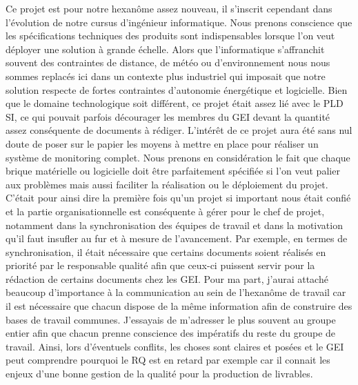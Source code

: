 Ce projet est pour notre hexanôme assez nouveau, il s'inscrit cependant dans l'évolution de notre cursus d'ingénieur informatique. Nous prenons conscience que les spécifications techniques des produits sont indispensables lorsque l'on veut déployer une solution à grande échelle. Alors que l'informatique s'affranchit souvent des contraintes de distance, de météo ou d'environnement nous nous sommes replacés ici dans un contexte plus industriel qui imposait que notre solution respecte de fortes contraintes d'autonomie énergétique et logicielle. Bien que le domaine technologique soit différent, ce projet était assez lié avec le PLD SI, ce qui pouvait parfois décourager les membres du GEI devant la quantité assez conséquente de documents à rédiger. L'intérêt de ce projet aura été sans nul doute de poser sur le papier les moyens à mettre en place pour réaliser un système de monitoring complet. Nous prenons en considération le fait que chaque brique matérielle ou logicielle doit être parfaitement spécifiée si l'on veut palier aux problèmes mais aussi faciliter la réalisation ou le déploiement du projet. C'était pour ainsi dire la première fois qu'un projet si important nous était confié et la partie organisationnelle est conséquente à gérer pour le chef de projet, notamment dans la synchronisation des équipes de travail et dans la motivation qu'il faut insufler au fur et à mesure de l'avancement. Par exemple, en termes de synchronisation, il était nécessaire que certains documents soient réalisés en priorité par le responsable qualité afin que ceux-ci puissent servir pour la rédaction de certains documents chez les GEI. Pour ma part, j'aurai attaché beaucoup d'importance à la communication au sein de l'hexanôme de travail car il est nécessaire que chacun dispose de la même information afin de construire des bases de travail communes. J'essayais de m'adresser le plus souvent au groupe entier afin que chacun prenne conscience des impératifs du reste du groupe de travail. Ainsi, lors d'éventuels conflits, les choses sont claires et posées et le GEI peut comprendre pourquoi le RQ est en retard par exemple car il connait les enjeux d'une bonne gestion de la qualité pour la production de livrables.

